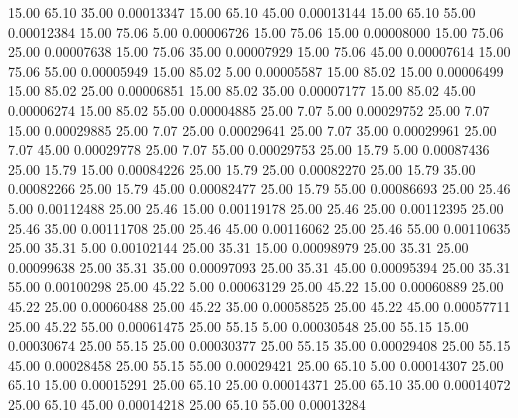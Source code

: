      15.00     65.10     35.00     0.00013347
     15.00     65.10     45.00     0.00013144
     15.00     65.10     55.00     0.00012384
     15.00     75.06      5.00     0.00006726
     15.00     75.06     15.00     0.00008000
     15.00     75.06     25.00     0.00007638
     15.00     75.06     35.00     0.00007929
     15.00     75.06     45.00     0.00007614
     15.00     75.06     55.00     0.00005949
     15.00     85.02      5.00     0.00005587
     15.00     85.02     15.00     0.00006499
     15.00     85.02     25.00     0.00006851
     15.00     85.02     35.00     0.00007177
     15.00     85.02     45.00     0.00006274
     15.00     85.02     55.00     0.00004885
     25.00      7.07      5.00     0.00029752
     25.00      7.07     15.00     0.00029885
     25.00      7.07     25.00     0.00029641
     25.00      7.07     35.00     0.00029961
     25.00      7.07     45.00     0.00029778
     25.00      7.07     55.00     0.00029753
     25.00     15.79      5.00     0.00087436
     25.00     15.79     15.00     0.00084226
     25.00     15.79     25.00     0.00082270
     25.00     15.79     35.00     0.00082266
     25.00     15.79     45.00     0.00082477
     25.00     15.79     55.00     0.00086693
     25.00     25.46      5.00     0.00112488
     25.00     25.46     15.00     0.00119178
     25.00     25.46     25.00     0.00112395
     25.00     25.46     35.00     0.00111708
     25.00     25.46     45.00     0.00116062
     25.00     25.46     55.00     0.00110635
     25.00     35.31      5.00     0.00102144
     25.00     35.31     15.00     0.00098979
     25.00     35.31     25.00     0.00099638
     25.00     35.31     35.00     0.00097093
     25.00     35.31     45.00     0.00095394
     25.00     35.31     55.00     0.00100298
     25.00     45.22      5.00     0.00063129
     25.00     45.22     15.00     0.00060889
     25.00     45.22     25.00     0.00060488
     25.00     45.22     35.00     0.00058525
     25.00     45.22     45.00     0.00057711
     25.00     45.22     55.00     0.00061475
     25.00     55.15      5.00     0.00030548
     25.00     55.15     15.00     0.00030674
     25.00     55.15     25.00     0.00030377
     25.00     55.15     35.00     0.00029408
     25.00     55.15     45.00     0.00028458
     25.00     55.15     55.00     0.00029421
     25.00     65.10      5.00     0.00014307
     25.00     65.10     15.00     0.00015291
     25.00     65.10     25.00     0.00014371
     25.00     65.10     35.00     0.00014072
     25.00     65.10     45.00     0.00014218
     25.00     65.10     55.00     0.00013284
